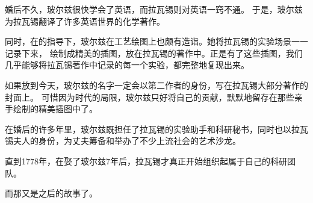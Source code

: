 \documentclass[a4paper]{article}
\begin{document}
婚后不久，玻尔兹很快学会了英语，而拉瓦锡则对英语一窍不通。
于是，玻尔兹为拉瓦锡翻译了许多英语世界的化学著作。

同时，在\os{}{-}的指导下，玻尔兹在工艺绘图上也颇有造诣。她将拉瓦锡的实验场景一一记录下来，
绘制成精美的插图，放在拉瓦锡的著作中。正是有了这些插图，我们几乎能够将拉瓦锡著作中记录的每一个实验，都完整地复现出来。

如果放到今天，玻尔兹的名字一定会以第二作者的身份，写在拉瓦锡大部分著作的封面上。
可惜因为时代的局限，玻尔兹只好将自己的贡献，默默地留存在那些亲手绘制的精美插图中了。

在婚后的许多年里，玻尔兹既担任了拉瓦锡的实验助手和科研秘书，同时也以拉瓦锡夫人的身份，为丈夫筹备和举办了不少上流社会的艺术沙龙。

直到1778年，在娶了玻尔兹7年后，拉瓦锡才真正开始组织起属于自己的科研团队。

而那又是之后的故事了。

\end{document}
